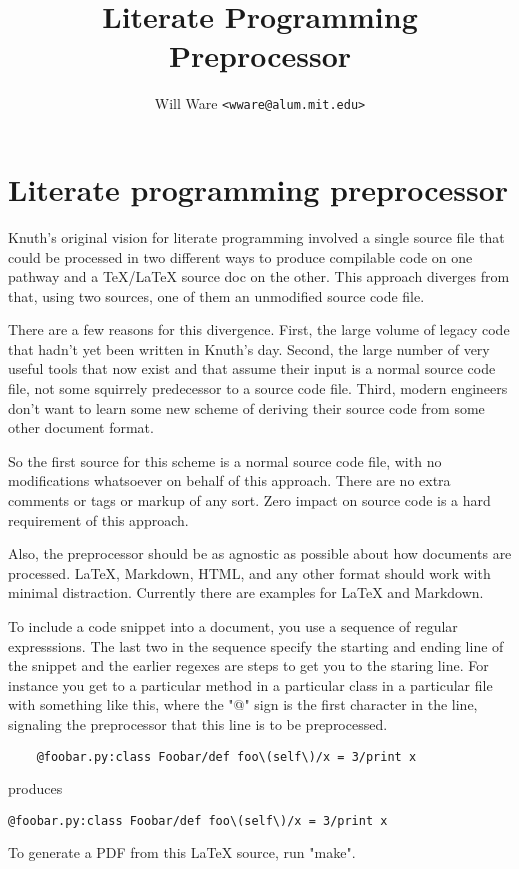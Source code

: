 \documentclass[11pt]{article}
\title{Literate Programming Preprocessor}
\author{Will Ware \texttt{<wware@alum.mit.edu>}}
\date{}
\begin{document}
\thispagestyle{plain}
\maketitle

\section{Literate programming preprocessor}

Knuth's original vision for literate programming involved a single source file that
could be processed in two different ways to produce compilable code on one pathway
and a TeX/LaTeX source doc on the other. This approach diverges from that, using two
sources, one of them an unmodified source code file.

There are a few reasons for this divergence. First, the large volume of legacy code
that hadn't yet been written in Knuth's day. Second, the large number of very useful
tools that now exist and that assume their input is a normal source code file, not
some squirrely predecessor to a source code file. Third, modern engineers don't want
to learn some new scheme of deriving their source code from some other document
format.

So the first source for this scheme is a normal source code file, with no modifications
whatsoever on behalf of this approach. There are no extra comments or tags or markup
of any sort. Zero impact on source code is a hard requirement of this approach.

Also, the preprocessor should be as agnostic as possible about how documents are
processed. LaTeX, Markdown, HTML, and any other format should work with minimal
distraction. Currently there are examples for LaTeX and Markdown.

To include a code snippet into a document, you use a sequence of regular expresssions.
The last two in the sequence specify the starting and ending line of the snippet
and the earlier regexes are steps to get you to the staring line. For instance you
get to a particular method in a particular class in a particular file with something
like this, where the "@" sign is the first character in the line, signaling the
preprocessor that this line is to be preprocessed.

\begin{verbatim}
    @foobar.py:class Foobar/def foo\(self\)/x = 3/print x
\end{verbatim}

produces

\begin{verbatim}
@foobar.py:class Foobar/def foo\(self\)/x = 3/print x
\end{verbatim}

To generate a PDF from this LaTeX source, run "make".
\end{document}
